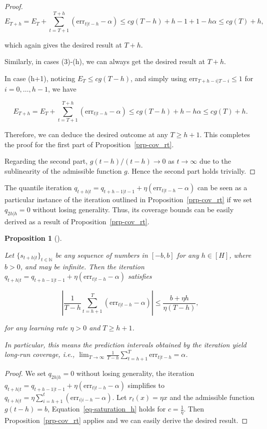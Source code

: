 \documentclass[
  11pt,
  a4paper,
]{article}
\theoremstyle{plain}
\newtheorem{proposition}{Proposition}[section]
\theoremstyle{plain}
\theoremstyle{remark}
\begin{document}
\begin{proof}
\[
E_{T+h} = E_T+\sum_{t=T+1}^{T+h}(\mathrm{err}_{t|t-h}-\alpha) \leq cg(T-h)+h-1+1-h\alpha \leq cg(T)+h,
\]

which again gives the desired result at \(T+h\).

Similarly, in cases (3)-(h), we can always get the desired result at
\(T+h\).

In case (h+1), noticing \(E_T \leq cg(T-h)\), and simply using
\(\mathrm{err}_{T+h-i|T-i} \leq 1\) for \(i=0,\ldots,h-1\), we have

\[
E_{T+h} = E_T+\sum_{t=T+1}^{T+h}(\mathrm{err}_{t|t-h}-\alpha) \leq cg(T-h)+h-h\alpha \leq cg(T)+h.
\]

Therefore, we can deduce the desired outcome at any \(T \geq h+1\). This
completes the proof for the first part of Proposition~\ref{prp-cov_rt}.

Regarding the second part, \(g(t-h)/(t-h) \rightarrow 0\) as
\(t \rightarrow \infty\) due to the sublinearity of the admissible
function \(g\). Hence the second part holds trivially.
\end{proof}

The quantile iteration
\(q_{t+h|t}=q_{t+h-1|t-1}+\eta \left(\mathrm{err}_{t|t-h}-\alpha\right)\)
can be seen as a particular instance of the iteration outlined in
Proposition~\ref{prp-cov_rt} if we set \(q_{2h|h}=0\) without losing
generality. Thus, its coverage bounds can be easily derived as a result
of Proposition~\ref{prp-cov_rt}.

\begin{proposition}[]\protect\hypertarget{prp-cov_qt}{}\label{prp-cov_qt}

Let \(\{s_{t+h|t}\}_{t\in\mathbb{N}}\) be any sequence of numbers in
\([-b, b]\) for any \(h\in[H]\), where \(b>0\), and may be infinite.
Then the iteration
\(q_{t+h|t}=q_{t+h-1|t-1}+\eta \left(\mathrm{err}_{t|t-h}-\alpha\right)\)
satisfies

\[
\left|\frac{1}{T-h}\sum_{t=h+1}^{T}\left(\mathrm{err}_{t|t-h}-\alpha\right)\right| \leq \frac{b + \eta h}{\eta\left(T-h\right)},
\]

for any learning rate \(\eta > 0\) and \(T \geq h+1\).

In particular, this means the prediction intervals obtained by the
iteration yield long-run coverage, i.e.,
\(\lim _{T \rightarrow \infty} \frac{1}{T-h} \sum_{t=h+1}^T \mathrm{err}_{t|t-h} = \alpha\).

\end{proposition}

\begin{proof}
We set \(q_{2h|h}=0\) without losing generality, the iteration
\(q_{t+h|t}=q_{t+h-1|t-1}+\eta \left(\mathrm{err}_{t|t-h}-\alpha\right)\)
simplifies to
\(q_{t+h|t}=\eta \sum_{i=h+1}^{t}\left(\mathrm{err}_{i|i-h}-\alpha\right)\).
Let \(r_t(x) = \eta x\) and the admissible function \(g(t-h) = b\),
Equation~\ref{eq-saturation_h} holds for \(c=\frac{1}{\eta}\). Then
Proposition~\ref{prp-cov_rt} applies and we can easily derive the
desired result.
\end{proof}
\end{document}
